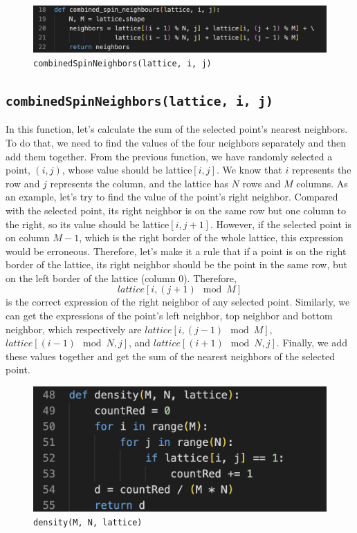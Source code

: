 \documentclass[11pt]{book}
\begin{document}
\begin{figure}
    \centering
    \includegraphics[width=1\linewidth]{nn_combined_spin_neighbors.png}
    \caption{\texttt{combinedSpinNeighbors(lattice, i, j)}}
    \label{fig42}
\end{figure}

\subsection{\texttt{combinedSpinNeighbors(lattice, i, j)}}

In this function, let's calculate the sum of the selected point's nearest neighbors. To do that, we need to find the values of the four neighbors separately and then add them together. From the previous function, we have randomly selected a point, $(i, j)$, whose value should be lattice$[i, j]$. We know that $i$ represents the row and $j$ represents the column, and the lattice has $N$ rows and $M$ columns. As an example, let's try to find the value of the point's right neighbor. Compared with the selected point, its right neighbor is on the same row but one column to the right, so its value should be lattice$[i, j + 1]$. However, if the selected point is on column $M - 1$, which is the right border of the whole lattice, this expression would be erroneous. Therefore, let's make it a rule that if a point is on the right border of the lattice, its right neighbor should be the point in the same row, but on the left border of the lattice (column $0$). Therefore, 
\[
lattice[i, (j + 1) \mod M]
\]
is the correct expression of the right neighbor of any selected point. Similarly, we can get the expressions of the point's left neighbor, top neighbor and bottom neighbor, which respectively are $lattice[i, (j - 1) \mod M]$, $lattice[(i - 1) \mod N, j]$, and $lattice[(i + 1) \mod N, j]$. Finally, we add these values together and get the sum of the nearest neighbors of the selected point.

\begin{figure}
    \centering
    \includegraphics[width=1\linewidth]{nn_densityOfRed.png}
    \caption{\texttt{density(M, N, lattice)}}
    \label{fig43}
\end{figure}
\end{document}
